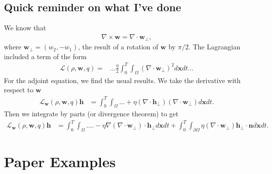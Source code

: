 \documentclass[11pt, a4paper]{article}
\theoremstyle{definition}
\newcommand{\w}{\mathbf{w}}
\newcommand{\x}{\mathbf{x}}
\newcommand{\n}{\mathbf{n}}
\newcommand{\h}{\mathbf{h}}
\begin{document}
	\subsection{Quick reminder on what I've done }
	We know that
	\begin{align*}
		\nabla \times \w = \nabla \cdot  \w_\bot,
	\end{align*}
	where $\w_\bot = (w_2 , -w_1)$, the result of a rotation of $\w$ by $\pi/2$.
	The Lagrangian included a term of the form
	\begin{align*}
		\mathcal L (\rho, \w ,q) =& ...  \frac{\eta}{2}\int_0^T \int_\Omega \left(\nabla \cdot  \w_\bot\right)^2 d\x dt ...
	\end{align*}
	For the adjoint equation, we find the usual results.
	We take the derivative with respect to $\w$
	\begin{align*}
		\mathcal L_\w(\rho, \w, q)\h &= \int_0^T \int_\Omega ... + \eta \left(\nabla \cdot  \h_\bot\right) \left(\nabla \cdot  \w_\bot\right)d\x dt.
	\end{align*}
	Then we integrate by parts (or divergence theorem) to get
	\begin{align*}
		\mathcal L_\w(\rho, \w, q)\h &= \int_0^T \int_\Omega.... - \eta \nabla\left(\nabla \cdot  \w_\bot\right)  \cdot \h_\bot d\x dt + \int_0^T \int_{\partial \Omega} \eta \left(\nabla \cdot  \w_\bot\right) \h_\bot \cdot \n d \x dt.
	\end{align*}
	\section{Paper Examples}
\end{document}
